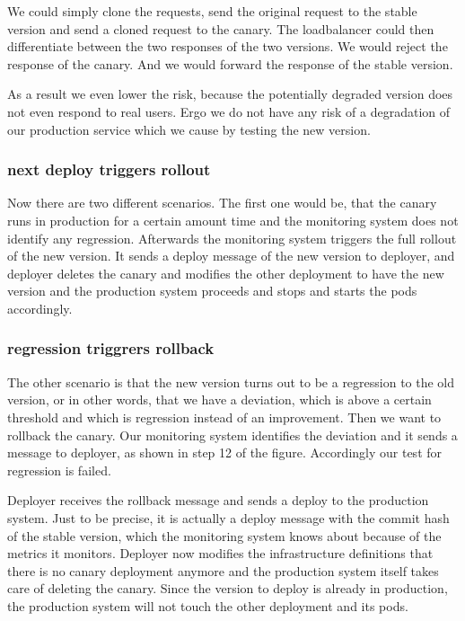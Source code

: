 We could simply clone the requests, send the original request to the stable version and
send a cloned request to the canary. The loadbalancer could then differentiate between the
two responses of the two versions. We would reject the response of the canary. And we
would forward the response of the stable version.

As a result we even lower the risk, because the potentially degraded version does not even
respond to real users. Ergo we do not have any risk of a degradation of our production
service which we cause by testing the new version.

\subsubsection{next deploy triggers rollout}
Now there are two different scenarios. The first one would be, that the canary runs in
production for a certain amount time and the monitoring system does not identify any
regression. Afterwards the monitoring system triggers the full rollout of the new
version. It sends a deploy message of the new version to deployer, and deployer deletes
the canary and modifies the other deployment to have the new version and the production
system proceeds and stops and starts the pods accordingly.

\subsubsection{regression triggrers rollback}
The other scenario is that the new version turns out to be a regression to the old
version, or in other words, that we have a deviation, which is above a certain threshold
and which is regression instead of an improvement. Then we want to rollback the
canary. Our monitoring system identifies the deviation and it sends a message to deployer,
as shown in step 12 of the figure. Accordingly our test for regression is failed.

Deployer receives the rollback message and sends a deploy to the production system. Just
to be precise, it is actually a deploy message with the commit hash of the stable version,
which the monitoring system knows about because of the metrics it monitors. Deployer now
modifies the infrastructure definitions that there is no canary deployment anymore and the
production system itself takes care of deleting the canary. Since the version to deploy is
already in production, the production system will not touch the other deployment and its
pods.


